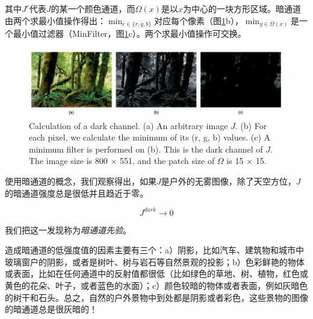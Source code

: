 \documentclass{ctexart}
\begin{document}
其中$J^c$代表$J$的某一个颜色通道，而$\Omega(x)$是以$x$为中心的一块方形区域。暗通道由两个求最小值操作得出：$\min_{c \in \{ r, g, b\}}$对应每个像素（图\ref{fig:03}b），$\min_{y \in \Omega(x)}$是一个最小值过滤器（MinFilter，图\ref{fig:03}c）。两个求最小值操作可交换。\par

\begin{figure}[tbp]
    \centering
    \includegraphics[width=\textwidth]{img/03.png}
    \caption{Calculation of a dark channel. (a) An arbitrary image $J$. (b) For each pixel, we calculate the minimum of its (r, g, b) values. (c) A minimum filter is performed on (b). This is the dark channel of $J$. The image size is 800 $\times$ 551, and the patch size of $\Omega$ is 15 $\times$ 15.}
    \label{fig:03}
\end{figure}

使用暗通道的概念，我们观察得出，如果$J$是户外的无雾图像，除了天空方位，$J$的暗通道强度总是很低并且趋近于零。

\begin{equation}\label{equ:6}
    J^{dark} \to 0
\end{equation}

我们把这一发现称为\emph{暗通道先验}。\par

造成暗通道的低强度值的因素主要有三个：a）阴影，比如汽车、建筑物和城市中玻璃窗户的阴影，或者是树叶、树与岩石等自然景观的投影；b）色彩鲜艳的物体或表面，比如在任何通道中的反射值都很低（比如绿色的草地、树、植物，红色或黄色的花朵、叶子，或者蓝色的水面）；c）颜色较暗的物体或者表面，例如灰暗色的树干和石头。总之，自然的户外景物中到处都是阴影或者彩色，这些景物的图像的暗通道总是很灰暗的！\par





\end{document}
